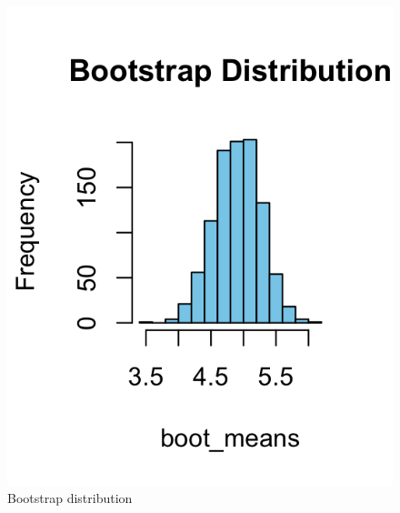 \documentclass{article}
\begin{document}
\begin{figure}[h!]
\centering
\begin{minipage}[b]{0.45\textwidth}
  \centering
  \includegraphics[width=\textwidth]{Rplot02.png}
  \caption{Bootstrap distribution}
  \label{fig:bootstrap-dist}
\end{minipage}
\hfill
\begin{minipage}[b]{0.45\textwidth}
  \centering

\end{minipage}
\end{figure}
\end{document}
